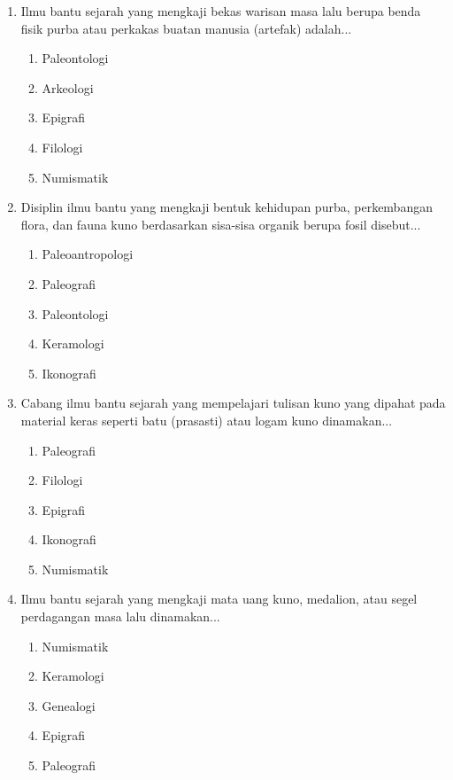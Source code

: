 \documentclass[12pt, a4paper]{article}
\begin{document}
\begin{enumerate}[label=\arabic*.]
    \item Ilmu bantu sejarah yang mengkaji bekas warisan masa lalu berupa benda fisik purba atau perkakas buatan manusia (artefak) adalah...
    \begin{enumerate}[label=\Alph*.]
        \item Paleontologi
        \item Arkeologi
        \item Epigrafi
        \item Filologi
        \item Numismatik
    \end{enumerate}

    \item Disiplin ilmu bantu yang mengkaji bentuk kehidupan purba, perkembangan flora, dan fauna kuno berdasarkan sisa-sisa organik berupa fosil disebut...
    \begin{enumerate}[label=\Alph*.]
        \item Paleoantropologi
        \item Paleografi
        \item Paleontologi
        \item Keramologi
        \item Ikonografi
    \end{enumerate}

    \item Cabang ilmu bantu sejarah yang mempelajari tulisan kuno yang dipahat pada material keras seperti batu (prasasti) atau logam kuno dinamakan...
    \begin{enumerate}[label=\Alph*.]
        \item Paleografi
        \item Filologi
        \item Epigrafi
        \item Ikonografi
        \item Numismatik
    \end{enumerate}

    \item Ilmu bantu sejarah yang mengkaji mata uang kuno, medalion, atau segel perdagangan masa lalu dinamakan...
    \begin{enumerate}[label=\Alph*.]
        \item Numismatik
        \item Keramologi
        \item Genealogi
        \item Epigrafi
        \item Paleografi
    \end{enumerate}


\end{enumerate}
\end{document}
